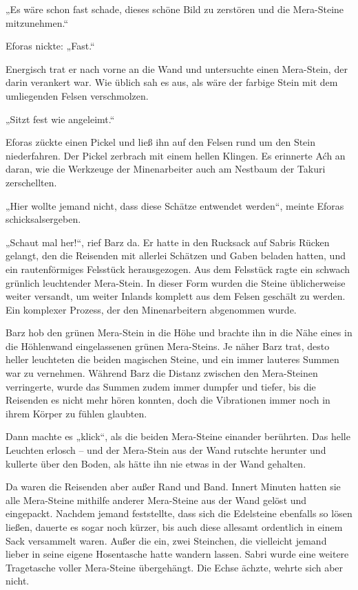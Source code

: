„Es wäre schon fast schade, dieses schöne Bild zu zerstören und die Mera-Steine mitzunehmen.“

Eforas nickte: „Fast.“

Energisch trat er nach vorne an die Wand und untersuchte einen Mera-Stein, der darin verankert war. Wie üblich sah es aus, als wäre der farbige Stein mit dem umliegenden Felsen verschmolzen.

„Sitzt fest wie angeleimt.“

Eforas zückte einen Pickel und ließ ihn auf den Felsen rund um den Stein niederfahren. Der Pickel zerbrach mit einem hellen Klingen. Es erinnerte Aćh an daran, wie die Werkzeuge der Minenarbeiter auch am Nestbaum der Takuri zerschellten.

„Hier wollte jemand nicht, dass diese Schätze entwendet werden“, meinte Eforas schicksalsergeben.

„Schaut mal her!“, rief Barz da. Er hatte in den Rucksack auf Sabris Rücken gelangt, den die Reisenden mit allerlei Schätzen und Gaben beladen hatten, und ein rautenförmiges Felsstück herausgezogen. Aus dem Felsstück ragte ein schwach grünlich leuchtender Mera-Stein. In dieser Form wurden die Steine üblicherweise weiter versandt, um weiter Inlands komplett aus dem Felsen geschält zu werden. Ein komplexer Prozess, der den Minenarbeitern abgenommen wurde.

Barz hob den grünen Mera-Stein in die Höhe und brachte ihn in die Nähe eines in die Höhlenwand eingelassenen grünen Mera-Steins. Je näher Barz trat, desto heller leuchteten die beiden magischen Steine, und ein immer lauteres Summen war zu vernehmen. Während Barz die Distanz zwischen den Mera-Steinen verringerte, wurde das Summen zudem immer dumpfer und tiefer, bis die Reisenden es nicht mehr hören konnten, doch die Vibrationen immer noch in ihrem Körper zu fühlen glaubten.

Dann machte es „klick“, als die beiden Mera-Steine einander berührten. Das helle Leuchten erlosch – und der Mera-Stein aus der Wand rutschte herunter und kullerte über den Boden, als hätte ihn nie etwas in der Wand gehalten.

Da waren die Reisenden aber außer Rand und Band. Innert Minuten hatten sie alle Mera-Steine mithilfe anderer Mera-Steine aus der Wand gelöst und eingepackt. Nachdem jemand feststellte, dass sich die Edelsteine ebenfalls so lösen ließen, dauerte es sogar noch kürzer, bis auch diese allesamt ordentlich in einem Sack versammelt waren. Außer die ein, zwei Steinchen, die vielleicht jemand lieber in seine eigene Hosentasche hatte wandern lassen. Sabri wurde eine weitere Tragetasche voller Mera-Steine übergehängt. Die Echse ächzte, wehrte sich aber nicht.

